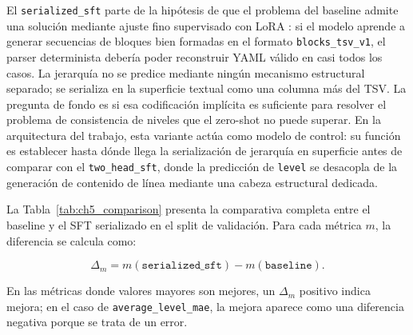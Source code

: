 El \texttt{serialized\_sft} parte de la hipótesis de que el problema del baseline admite una
solución mediante ajuste fino supervisado con LoRA \citep{hu2021lora, dettmers2023qlora, wu2025sft}: si el modelo aprende a generar secuencias
de bloques bien formadas en el formato \texttt{blocks\_tsv\_v1}, el parser determinista debería
poder reconstruir YAML válido en casi todos los casos. La jerarquía no se predice mediante
ningún mecanismo estructural separado; se serializa en la superficie textual como una columna
más del TSV. La pregunta de fondo es si esa codificación implícita es suficiente para resolver
el problema de consistencia de niveles que el zero-shot no puede superar.
En la arquitectura del trabajo, esta variante actúa como modelo de control: su función es
establecer hasta dónde llega la serialización de jerarquía en superficie antes de comparar
con el \texttt{two\_head\_sft}, donde la predicción de \texttt{level} se desacopla de la
generación de contenido de línea mediante una cabeza estructural dedicada.

La Tabla~\ref{tab:ch5_comparison} presenta la comparativa completa entre el baseline y el SFT
serializado en el split de validación. Para cada métrica \(m\), la diferencia se calcula como:

\[
\Delta_m = m(\texttt{serialized\_sft}) - m(\texttt{baseline}).
\]

En las métricas donde valores mayores son mejores, un \(\Delta_m\) positivo indica mejora; en el caso de \texttt{average\_level\_mae}, la mejora aparece como una diferencia negativa porque se trata de un error.

